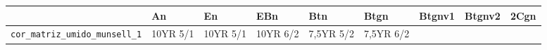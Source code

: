 \documentclass[a4paper,dvipsnames]{tufte-book}
\begin{document}
\begin{longtable}[]{@{}lllllllll@{}}
\toprule
\begin{minipage}[b]{0.21\columnwidth}\raggedright\strut
\strut
\end{minipage} & \begin{minipage}[b]{0.06\columnwidth}\raggedright\strut
An\strut
\end{minipage} & \begin{minipage}[b]{0.06\columnwidth}\raggedright\strut
En\strut
\end{minipage} & \begin{minipage}[b]{0.07\columnwidth}\raggedright\strut
EBn\strut
\end{minipage} & \begin{minipage}[b]{0.07\columnwidth}\raggedright\strut
Btn\strut
\end{minipage} & \begin{minipage}[b]{0.07\columnwidth}\raggedright\strut
Btgn\strut
\end{minipage} & \begin{minipage}[b]{0.07\columnwidth}\raggedright\strut
Btgnv1\strut
\end{minipage} & \begin{minipage}[b]{0.07\columnwidth}\raggedright\strut
Btgnv2\strut
\end{minipage} & \begin{minipage}[b]{0.06\columnwidth}\raggedright\strut
2Cgn\strut
\end{minipage}\tabularnewline
\midrule
\endhead
\begin{minipage}[t]{0.21\columnwidth}\raggedright\strut
\texttt{cor\_matriz\_umido\_munsell\_1}\strut
\end{minipage} & \begin{minipage}[t]{0.06\columnwidth}\raggedright\strut
10YR 5/1\strut
\end{minipage} & \begin{minipage}[t]{0.06\columnwidth}\raggedright\strut
10YR 5/1\strut
\end{minipage} & \begin{minipage}[t]{0.07\columnwidth}\raggedright\strut
10YR 6/2\strut
\end{minipage} & \begin{minipage}[t]{0.07\columnwidth}\raggedright\strut
7,5YR 5/2\strut
\end{minipage} & \begin{minipage}[t]{0.07\columnwidth}\raggedright\strut
7,5YR 6/2\strut
\end{minipage} & \begin{minipage}[t]{0.07\columnwidth}\raggedright\strut

\end{minipage}
\end{longtable}
\end{document}
